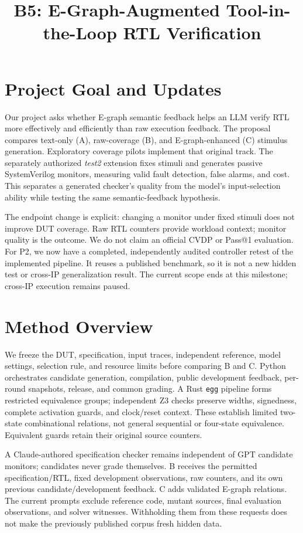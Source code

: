 \documentclass[conference,10pt,letterpaper]{IEEEtran}
\title{B5: E-Graph-Augmented Tool-in-the-Loop RTL Verification}
\author{\IEEEauthorblockN{Chiyu Chen (cc5583), Mingyuan Zheng (mz3143), Yiwen Chen (yc4653)}
\IEEEauthorblockA{COMS 6998: AI-Native Computing $\mid$ Fall 2026\\
P2: Prototype \& Pilot Results $\mid$ Due November 9, 2026, 11:59 PM ET}}
\begin{document}
\maketitle
\thispagestyle{plain}
\pagestyle{plain}

\section{Project Goal and Updates}
Our project asks whether E-graph semantic feedback helps an LLM verify RTL more
effectively and efficiently than raw execution feedback. The proposal compares
text-only (A), raw-coverage (B), and E-graph-enhanced (C) stimulus generation.
Exploratory coverage pilots implement that original track. The separately
authorized \emph{test2} extension fixes stimuli and generates passive
SystemVerilog monitors, measuring valid fault detection, false alarms, and cost.
This separates a generated checker's quality from the model's input-selection
ability while testing the same semantic-feedback hypothesis.

The endpoint change is explicit: changing a monitor under fixed stimuli does
not improve DUT coverage. Raw RTL counters provide workload context; monitor
quality is the outcome. We do not claim an official CVDP or Pass@1 evaluation.
For P2, we now have a completed, independently audited controller retest of the
implemented pipeline. It reuses a published benchmark, so it is not a new hidden
test or cross-IP generalization result. The current scope ends at this milestone;
cross-IP execution remains paused.

\section{Method Overview}
We freeze the DUT, specification, input traces, independent reference, model
settings, selection rule, and resource limits before comparing B and C. Python
orchestrates candidate generation, compilation, public development feedback,
per-round snapshots, release, and common grading. A Rust \texttt{egg} pipeline
forms restricted equivalence groups; independent Z3 checks preserve widths,
signedness, complete activation guards, and clock/reset context. These establish
limited two-state combinational relations, not general sequential or four-state
equivalence. Equivalent guards retain their original source counters.

A Claude-authored specification checker remains independent of GPT candidate
monitors; candidates never grade themselves. B receives the permitted
specification/RTL, fixed development observations, raw counters, and its own
previous candidate/development feedback. C adds validated E-graph relations.
The current prompts exclude reference code, mutant sources, final evaluation
observations, and solver witnesses. Withholding them from these requests does
not make the previously published corpus fresh hidden data.
\end{document}
